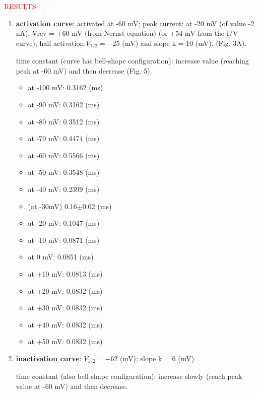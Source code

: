\textcolor{red}{RESULTS}
\begin{enumerate}
  
  \item {\bf activation curve}:  activated at -60 mV; peak current: at -20 mV
  (of value -2 nA); Vrev = +60 mV (from Nernst equation) (or +54 mV from the I/V
  curve); half activation:$V_{1/2} = -25$ (mV) and slope k = 10 (mV).
  (Fig. 3A).
  
  
  time constant (curve has bell-shape configuration): increase value (reaching
  peak at -60 mV) and then decrease (Fig. 5).
  
  \begin{itemize}
    \item at -100 mV: 0.3162 (ms)
    \item at -90 mV: 0.3162 (ms)
    \item at -80 mV: 0.3512 (ms)
    \item at -70 mV: 0.4474 (ms)
    \item at -60 mV: 0.5566 (ms)
    \item at -50 mV: 0.3548 (ms)
    \item at -40 mV: 0.2399 (ms)
    \item (at -30mV) 0.16$\pm$0.02 (ms)
    \item at -20 mV: 0.1047 (ms)
    \item at -10 mV: 0.0871 (ms)
    \item at 0 mV: 0.0851 (ms)
    \item at +10 mV: 0.0813 (ms)
    \item at +20 mV: 0.0832 (ms)
    \item at +30 mV: 0.0832 (ms)
    \item at +40 mV: 0.0832 (ms)
    \item at +50 mV: 0.0832 (ms)
  \end{itemize}  
  
  \item {\bf inactivation curve}: $V_{1/2} = -62$ (mV); slope k = 6 (mV)
  
  time constant (also bell-shape configuration): increase slowly (reach peak
  value at -60 mV) and then decrease. 
  

\end{enumerate}
